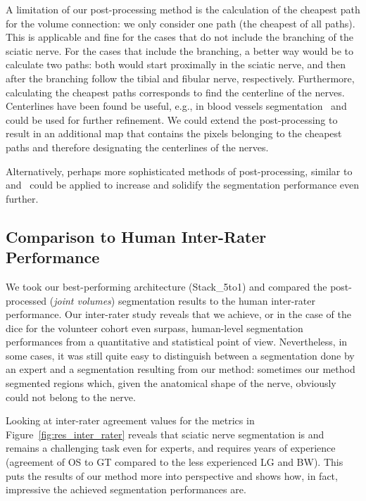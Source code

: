 A limitation of our post-processing method is the calculation of the cheapest path for the volume connection: we only consider one path (the cheapest of all paths). This is applicable and fine for the cases that do not include the branching of the sciatic nerve. For the cases that include the branching, a better way would be to calculate two paths: both would start proximally in the sciatic nerve, and then after the branching follow the tibial and fibular nerve, respectively.
Furthermore, calculating the cheapest paths corresponds to find the centerline of the nerves. Centerlines have been found be useful, e.g., in blood vessels segmentation~\cite{Lesage2009ASchemes} and could be used for further refinement. We could extend the post-processing to result in an additional map that contains the pixels belonging to the cheapest paths and therefore designating the centerlines of the nerves.

Alternatively, perhaps more sophisticated methods of post-processing, similar to~\cite{Rempfler2015ReconstructingProgramming} and~\cite{Selvan2018ExtractionNetworks} could be applied to increase and solidify the segmentation performance even further. 

\subsection{Comparison to Human Inter-Rater Performance}
We took our best-performing architecture (Stack\_5to1) and compared the post-processed (\textit{joint volumes}) segmentation results to the human inter-rater performance. Our inter-rater study reveals that we achieve, or in the case of the \acrlong{dice} for the volunteer cohort even surpass, human-level segmentation performances from a quantitative and statistical point of view. Nevertheless, in some cases, it was still quite easy to distinguish between a segmentation done by an expert and a segmentation resulting from our method: sometimes our method segmented regions which, given the anatomical shape of the nerve, obviously could not belong to the nerve.

Looking at inter-rater agreement values for the metrics in Figure~\ref{fig:res_inter_rater} reveals that sciatic nerve segmentation is and remains a challenging task even for experts, and requires years of experience (agreement of OS to GT compared to the less experienced LG and BW). This puts the results of our method more into perspective and shows how, in fact, impressive the achieved segmentation performances are.

